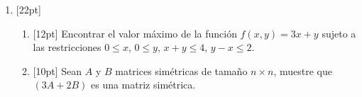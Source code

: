 \documentclass[11pt]{article}
\begin{document}
\begin{enumerate}
\vspace{10cm}

\item{}[22pt]
\begin{enumerate}
\item{}[12pt] Encontrar el valor máximo de la función $f(x,y)=3x+y$ sujeto a las restricciones $0\leq x$, $0\leq y$, $x+y\leq 4$, $y-x\leq 2$.

\vspace{6cm}

\item{}[10pt] Sean $A$ y $B$ matrices simétricas de tamaño $n\times n$, muestre que $(3A+2B)$ es una matriz simétrica.

\vspace{1.5cm}
\end{enumerate}
\end{enumerate}

\examfooter
\end{document}
